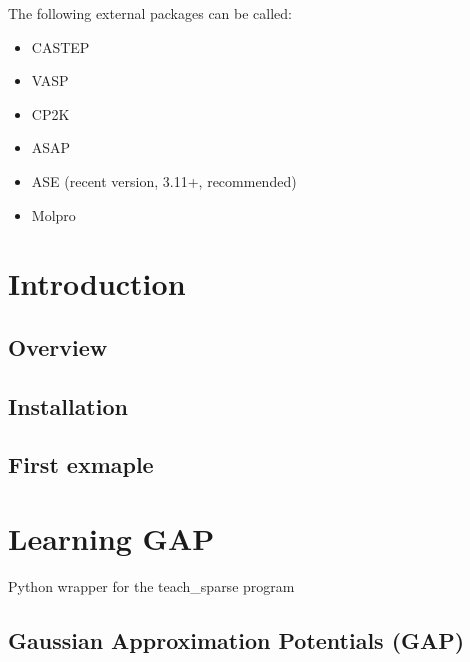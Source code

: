 \documentclass[letterpaper,10pt,english]{sphinxmanual}
\begin{document}
The following external packages can be called:
\begin{itemize}
\item {} 
CASTEP

\item {} 
VASP

\item {} 
CP2K

\item {} 
ASAP

\item {} 
ASE (recent version, 3.11+, recommended)

\item {} 
Molpro

\end{itemize}


\section{Introduction}
\label{\detokenize{introduction:introduction}}\label{\detokenize{introduction::doc}}

\subsection{Overview}
\label{\detokenize{introduction:overview}}

\subsection{Installation}
\label{\detokenize{introduction:installation}}

\subsection{First exmaple}
\label{\detokenize{introduction:first-exmaple}}\label{\detokenize{gap:module-gap}}

\section{Learning GAP}
\label{\detokenize{gap:learning-gap}}\label{\detokenize{gap::doc}}
Python wrapper for the teach\_sparse program


\subsection{Gaussian Approximation Potentials (GAP)}
\label{\detokenize{gap:gaussian-approximation-potentials-gap}}
\end{document}

